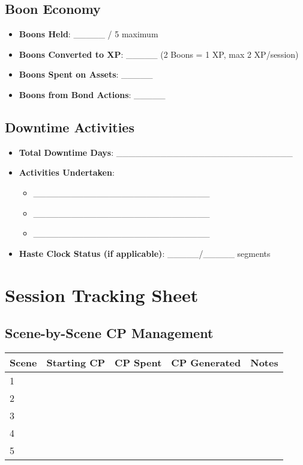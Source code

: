 \documentclass[11pt,letterpaper]{article}
\begin{document}
\subsection{Boon Economy}

\begin{itemize}
    \item \textbf{Boons Held}: \_\_\_\_\_ / 5 maximum
    \item \textbf{Boons Converted to XP}: \_\_\_\_\_ (2 Boons = 1 XP, max 2 XP/session)
    \item \textbf{Boons Spent on Assets}: \_\_\_\_\_
    \item \textbf{Boons from Bond Actions}: \_\_\_\_\_
\end{itemize}

\subsection{Downtime Activities}

\begin{itemize}
    \item \textbf{Total Downtime Days}: \_\_\_\_\_\_\_\_\_\_\_\_\_\_\_\_\_\_\_\_\_\_\_\_\_\_\_\_
    \item \textbf{Activities Undertaken}: 
    \begin{itemize}
        \item \_\_\_\_\_\_\_\_\_\_\_\_\_\_\_\_\_\_\_\_\_\_\_\_\_\_\_\_
        \item \_\_\_\_\_\_\_\_\_\_\_\_\_\_\_\_\_\_\_\_\_\_\_\_\_\_\_\_
        \item \_\_\_\_\_\_\_\_\_\_\_\_\_\_\_\_\_\_\_\_\_\_\_\_\_\_\_\_
    \end{itemize}
    \item \textbf{Haste Clock Status (if applicable)}: \_\_\_\_\_/\_\_\_\_\_ segments
\end{itemize}

\newpage

\section{Session Tracking Sheet}

\subsection{Scene-by-Scene CP Management}

\begin{tabularx}{\textwidth}{|l|c|c|c|X|}
\hline
\textbf{Scene} & \textbf{Starting CP} & \textbf{CP Spent} & \textbf{CP Generated} & \textbf{Notes} \\
\hline
1 & & & & \\
2 & & & & \\
3 & & & & \\
4 & & & & \\
5 & & & & \\
\hline
\end{tabularx}
\end{document}
